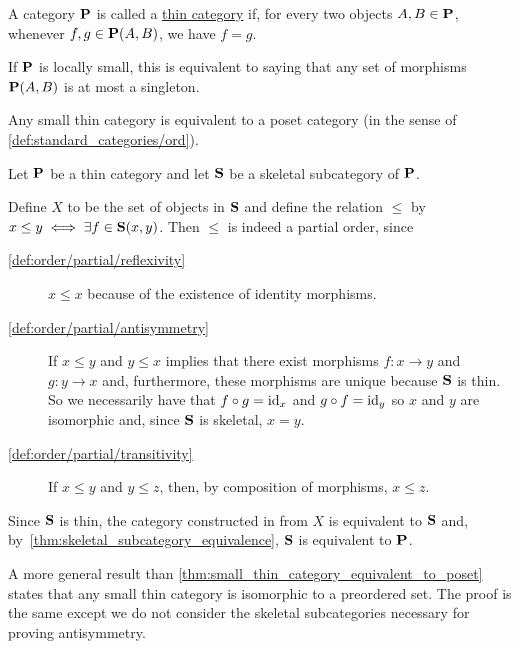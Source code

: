 \begin{definition}\label{def:thin_category}\cite{nLab:thin_category}
  A category $\operatorname{\mathbf{P}}$ is called a \uline{thin category} if, for every two objects $A, B \in \operatorname{\mathbf{P}}$, whenever $f, g \in \operatorname{\mathbf{P}}(A, B)$, we have $f = g$.

  If $\operatorname{\mathbf{P}}$ is locally small, this is equivalent to saying that any set of morphisms $\operatorname{\mathbf{P}}(A, B)$ is at most a singleton.
\end{definition}

\begin{proposition}\label{thm:small_thin_category_equivalent_to_poset}
  Any small thin category is equivalent to a poset category (in the sense of \cref{def:standard_categories/ord}).
\end{proposition}
\begin{definition}
  Let $\operatorname{\mathbf{P}}$ be a thin category and let $\operatorname{\mathbf{S}}$ be a skeletal subcategory of $\operatorname{\mathbf{P}}$.

  Define $X$ to be the set of objects in $\operatorname{\mathbf{S}}$ and define the relation $\leq$ by $x \leq y \iff \exists f \in \operatorname{\mathbf{S}}(x, y)$. Then $\leq$ is indeed a partial order, since
  \begin{description}
    \item[\ref{def:order/partial/reflexivity}] $x \leq x$ because of the existence of identity morphisms.
    \item[\ref{def:order/partial/antisymmetry}] If $x \leq y$ and $y \leq x$ implies that there exist morphisms $f: x \to y$ and $g: y \to x$ and, furthermore, these morphisms are unique because $\operatorname{\mathbf{S}}$ is thin. So we necessarily have that $f \circ g = \operatorname{id}_x$ and $g \circ f = \operatorname{id}_y$ so $x$ and $y$ are isomorphic and, since $\operatorname{\mathbf{S}}$ is skeletal, $x = y$.
    \item[\ref{def:order/partial/transitivity}] If $x \leq y$ and $y \leq z$, then, by composition of morphisms, $x \leq z$.
  \end{description}

  Since $\operatorname{\mathbf{S}}$ is thin, the category constructed in from $X$ is equivalent to $\operatorname{\mathbf{S}}$ and, by~\cref{thm:skeletal_subcategory_equivalence}, $\operatorname{\mathbf{S}}$ is equivalent to $\operatorname{\mathbf{P}}$.
\end{definition}

\begin{note}\label{note:small_thin_category_isomorphic_to_preorder}
  A more general result than \cref{thm:small_thin_category_equivalent_to_poset} states that any small thin category is isomorphic to a preordered set. The proof is the same except we do not consider the skeletal subcategories necessary for proving antisymmetry.
\end{note}
